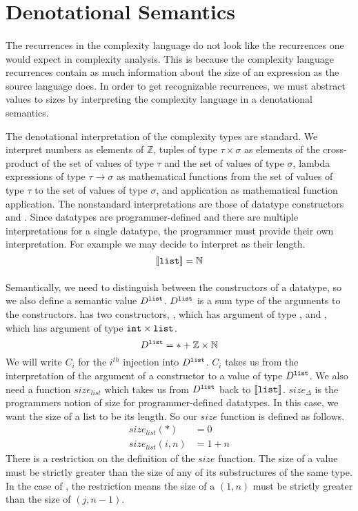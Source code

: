 \section{Denotational Semantics}

\paragraph{}
The recurrences in the complexity language do not look like the recurrences one
would expect in complexity analysis. This is because the complexity language
recurrences contain as much information about the size of an expression as the
source language does. In order to get recognizable recurrences, we must
abstract values to sizes by interpreting the complexity language in a
denotational semantics.



The denotational interpretation of the complexity types are standard. We
interpret numbers as elements of $\mathbb{Z}$, tuples of type $\tau \times
\sigma$ as elements of the cross-product of the set of values of type $\tau$
and the set of values of type $\sigma$, lambda expressions of type $\tau \to
\sigma$ as mathematical functions from the set of values of type $\tau$ to the
set of values of type $\sigma$, and application as mathematical function
application. The nonstandard interpretations are those of datatype constructors
and . Since datatypes are programmer-defined and there are multiple
interpretations for a single datatype, the programmer must provide their own
interpretation. For example we may decide to interpret  as their length.
%
\[
  \llbracket \texttt{list} \rrbracket = \mathbb{N}
\]
%
\paragraph{}
Semantically, we need to distinguish between the constructors of a datatype, so
we also define a semantic value $D^{\texttt{list}}$. $D^{\texttt{list}}$ is a sum type of the
arguments to the  constructors.  has two constructors, ,
which has argument of type , and , which has argument of type
$\texttt{int} \times \texttt{list}$.
%
\[
  D^{\texttt{list}} = \ast + \mathbb{Z} \times \mathbb{N}
\]
%
We will write $C_i$ for the $i^{th}$ injection into $D^{\texttt{list}}$. $C_i$ takes
us from the interpretation of the argument of a constructor to a value of type
$D^{\texttt{list}}$. We also need a function $size_{list}$ which takes us from
$D^{\texttt{list}}$ back to $\llbracket \texttt{list} \rrbracket$. $size_\Delta$ is the
programmers notion of size for programmer-defined datatypes. In this case, we want
the size of a list to be its length. So our $size$ function is defined as
follows.
%
\begin{align*}
  size_{list} (\ast) &= 0 \\
  size_{list}(i,n) &= 1 + n
\end{align*}
%
There is a restriction on the definition of the $size$ function. The size of a
value must be strictly greater than the size of any of its substructures of the
same type. In the case of , the restriction means the size of a $(1,
n)$ must be strictly greater than the size of $(j, n-1)$.

